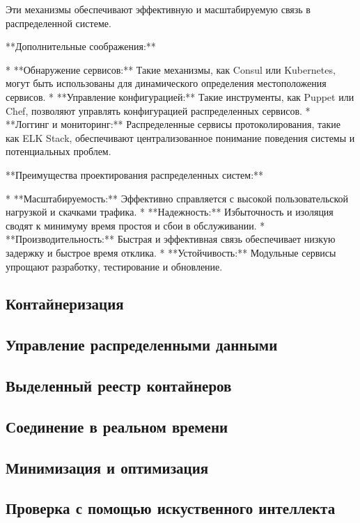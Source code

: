 Эти механизмы обеспечивают эффективную и масштабируемую связь в распределенной системе.

**Дополнительные соображения:**

* **Обнаружение сервисов:** Такие механизмы, как Consul или Kubernetes, могут быть использованы для динамического определения местоположения сервисов.
* **Управление конфигурацией:** Такие инструменты, как Puppet или Chef, позволяют управлять конфигурацией распределенных сервисов.
* **Логгинг и мониторинг:** Распределенные сервисы протоколирования, такие как ELK Stack, обеспечивают централизованное понимание поведения системы и потенциальных проблем.

**Преимущества проектирования распределенных систем:**

* **Масштабируемость:** Эффективно справляется с высокой пользовательской нагрузкой и скачками трафика.
* **Надежность:** Избыточность и изоляция сводят к минимуму время простоя и сбои в обслуживании.
* **Производительность:** Быстрая и эффективная связь обеспечивает низкую задержку и быстрое время отклика.
* **Устойчивость:** Модульные сервисы упрощают разработку, тестирование и обновление.

\subsection{Контайнеризация}

\subsection{Управление распределенными данными}

\subsection{Выделенный реестр контайнеров}

\subsection{Соединение в реальном времени}

\subsection{Минимизация и оптимизация}

\subsection{Проверка с помощью искуственного интеллекта}

